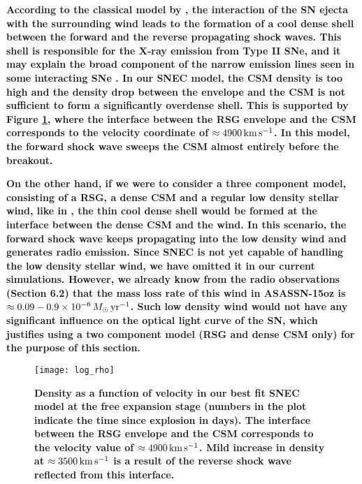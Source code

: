 \documentclass[a4paper,fleqn,usenatbib]{mnras}
\begin{document}
\textbf{According to the classical model by \citet{1982chevalier}, the interaction of the SN ejecta with the surrounding wind leads to the formation of a cool dense shell between the forward and the reverse propagating shock waves. 
This shell is responsible for the X-ray emission from Type II SNe, and it may explain the broad component of the narrow emission lines seen in some interacting SNe \citep{2001chugai}. 
In our SNEC model, the CSM density is too high and the density drop between the envelope and the CSM is not sufficient to form a significantly overdense shell. 
This is supported by Figure \ref{fig:CDS}, where the interface between the RSG envelope and the CSM corresponds to the velocity coordinate of $\approx 4900\,{\rm km}\,{\rm s}^{-1}$. 
In this model, the forward shock wave sweeps the CSM almost entirely before the breakout.}

\textbf{On the other hand, if we were to consider a three component model, consisting of a RSG, a dense CSM and a regular low density stellar wind, like in \citet{2018morozova}, the thin cool dense shell would be formed at the interface between the dense CSM and the wind. 
In this scenario, the forward shock wave keeps propagating into the low density wind and generates radio emission. Since SNEC is not yet capable of handling the low density stellar wind, we have omitted it in our current simulations. 
However, we already know from the radio observations (Section 6.2) that the mass loss rate of this wind in ASASSN-15oz is $\approx 0.09-0.9\times 10^{-6}\,M_{\odot}\,{\rm yr}^{-1}$.
Such low density wind would not have any significant influence on the optical light curve of the SN, which justifies using a two component model (RSG and dense CSM only) for the purpose of this section.}
\begin{figure}
\begin{center}
\texttt{[image: log\_rho]} %
\caption{\textbf{Density as a function of velocity in our best fit SNEC model at the free expansion stage (numbers in the plot indicate the time since explosion in days). 
The interface between the RSG envelope and the CSM corresponds to the velocity value of $\approx 4900\,{\rm km}\,{\rm s}^{-1}$. 
Mild increase in density at $\approx 3500\,{\rm km}\,{\rm s}^{-1}$ is a result of the reverse shock wave reflected from this interface.}}
\label{fig:CDS}
\end{center}
\end{figure}
\end{document}
